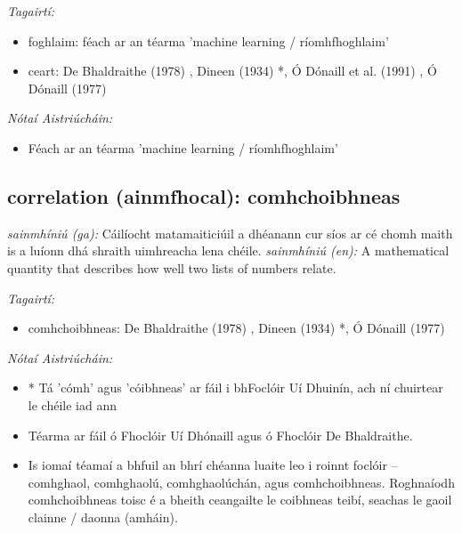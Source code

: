 \documentclass{article}
\begin{document}
 \noindent \textit{Tagairtí:}
\begin{itemize}
	\item foghlaim: féach ar an téarma 'machine learning / ríomhfhoghlaim'
	\item ceart: De Bhaldraithe (1978) \cite{de-bhaldraithe}, Dineen (1934) \cite{dineen}*, Ó Dónaill et al. (1991) \cite{focloir-beag}, Ó Dónaill (1977) \cite{odonaill}
\end{itemize}

 \noindent \textit{Nótaí Aistriúcháin:}
\begin{itemize}
	\item Féach ar an téarma 'machine learning / ríomhfhoghlaim'
\end{itemize}


\subsection*{correlation (ainmfhocal): comhchoibhneas} 
 \noindent \textit{sainmhíniú (ga):} Cáilíocht matamaiticiúil a dhéanann cur síos ar cé chomh maith is a luíonn dhá shraith uimhreacha lena chéile.
\newline\newline
 \noindent \textit{sainmhíniú (en):} A mathematical quantity that describes how well two lists of numbers relate.
\newline

 \noindent \textit{Tagairtí:}
\begin{itemize}
	\item comhchoibhneas: De Bhaldraithe (1978) \cite{de-bhaldraithe}, Dineen (1934) \cite{dineen}*, Ó Dónaill (1977) \cite{odonaill}
\end{itemize}

 \noindent \textit{Nótaí Aistriúcháin:}
\begin{itemize}
	\item * Tá 'cómh' agus 'cóibhneas' ar fáil i bhFoclóir Uí Dhuinín, ach ní chuirtear le chéile iad ann
	\item Téarma ar fáil ó Fhoclóir Uí Dhónaill agus ó Fhoclóir De Bhaldraithe.
	\item Is iomaí téamaí a bhfuil an bhrí chéanna luaite leo i roinnt foclóir -- comhghaol, comhghaolú, comhghaolúchán, agus comhchoibhneas. Roghnaíodh comhchoibhneas toisc é a bheith ceangailte le coibhneas teibí, seachas le gaoil clainne / daonna (amháin).
\end{itemize}
\end{document}
